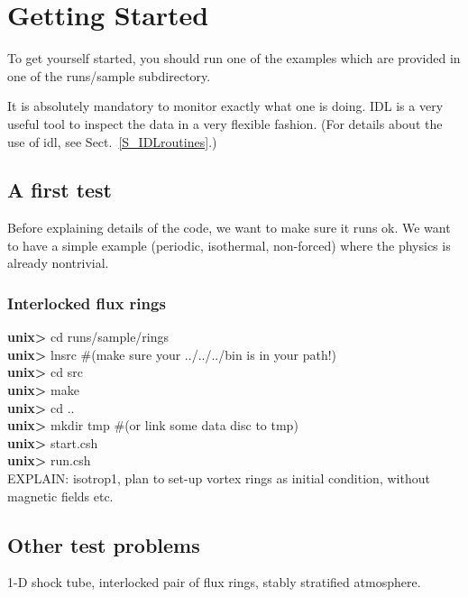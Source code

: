 \documentclass[12pt,twoside,notitlepage,a4paper]{article}
\newcommand{\prompt}[1]{{\ttfamily\bfseries{}#1}}
\begin{document}
\section{Getting Started}

To get yourself started, you should run one of the examples which are
provided in one of the runs/sample subdirectory.

It is absolutely mandatory to monitor exactly what one is doing.
IDL is a very useful tool to inspect the data in a very flexible fashion.
(For details about the use of idl, see Sect.~\ref{S_IDLroutines}.)

\subsection{A first test}

Before explaining details of the code, we want to make sure it runs ok.
We want to have a simple example (periodic, isothermal, non-forced)
where the physics is already nontrivial.

\subsubsection{Interlocked flux rings}

\prompt{unix> } cd runs/sample/rings\\
\prompt{unix> } lnsrc \quad\#(make sure your ../../../bin is in your path!)\\
\prompt{unix> } cd src\\
\prompt{unix> } make\\
\prompt{unix> } cd ..\\
\prompt{unix> } mkdir tmp \quad\#(or link some data disc to tmp)\\
\prompt{unix> } start.csh\\
\prompt{unix> } run.csh\\

EXPLAIN: isotrop1, plan to set-up vortex rings as initial condition,
without magnetic fields etc.

\subsection{Other test problems}

1-D shock tube, interlocked pair of flux rings, stably stratified atmosphere.

\end{document}
